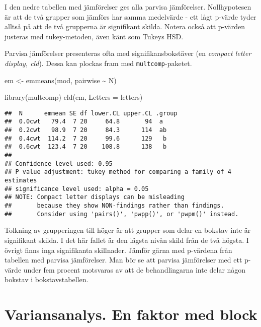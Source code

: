 \documentclass[
]{book}
\newenvironment{Shaded}{\begin{snugshade}}{\end{snugshade}}
\newcommand{\AttributeTok}[1]{\textcolor[rgb]{0.77,0.63,0.00}{#1}}
\newcommand{\FunctionTok}[1]{\textcolor[rgb]{0.00,0.00,0.00}{#1}}
\newcommand{\NormalTok}[1]{#1}
\newcommand{\OtherTok}[1]{\textcolor[rgb]{0.56,0.35,0.01}{#1}}
\newcommand{\SpecialCharTok}[1]{\textcolor[rgb]{0.00,0.00,0.00}{#1}}
\theoremstyle{definition}
\theoremstyle{definition}
\theoremstyle{definition}
\theoremstyle{definition}
\theoremstyle{remark}
\begin{document}
I den nedre tabellen med jämförelser ges alla parvisa jämförelser. Nollhypotesen är att de två grupper som jämförs har samma medelvärde - ett lågt p-värde tyder alltså på att de två grupperna är signifikant skilda. Notera också att p-värden justeras med tukey-metoden, även känt som Tukeys HSD.

Parvisa jämförelser presenteras ofta med signifikansbokstäver (en \emph{compact letter display, cld}). Dessa kan plockas fram med \texttt{multcomp}-paketet.

\begin{Shaded}
\begin{Highlighting}[]
\NormalTok{em }\OtherTok{\textless{}{-}} \FunctionTok{emmeans}\NormalTok{(mod, pairwise }\SpecialCharTok{\textasciitilde{}}\NormalTok{ N)}

\FunctionTok{library}\NormalTok{(multcomp)}
\FunctionTok{cld}\NormalTok{(em, }\AttributeTok{Letters =}\NormalTok{ letters)}
\end{Highlighting}
\end{Shaded}

\begin{verbatim}
##  N      emmean SE df lower.CL upper.CL .group
##  0.0cwt   79.4  7 20     64.8       94  a    
##  0.2cwt   98.9  7 20     84.3      114  ab   
##  0.4cwt  114.2  7 20     99.6      129   b   
##  0.6cwt  123.4  7 20    108.8      138   b   
## 
## Confidence level used: 0.95 
## P value adjustment: tukey method for comparing a family of 4 estimates 
## significance level used: alpha = 0.05 
## NOTE: Compact letter displays can be misleading
##       because they show NON-findings rather than findings.
##       Consider using 'pairs()', 'pwpp()', or 'pwpm()' instead.
\end{verbatim}

Tolkning av grupperingen till höger är att grupper som delar en bokstav inte är signifikant skilda. I det här fallet är den lägsta nivån skild från de två högsta. I övrigt finns inga signifikanta skillnader. Jämför gärna med p-värdena från tabellen med parvisa jämförelser. Man bör se att parvisa jämförelser med ett p-värde under fem procent motsvaras av att de behandlingarna inte delar någon bokstav i bokstavstabellen.

\hypertarget{variansanalys.-en-faktor-med-block}{%
\section{Variansanalys. En faktor med block}\label{variansanalys.-en-faktor-med-block}}
\end{document}
